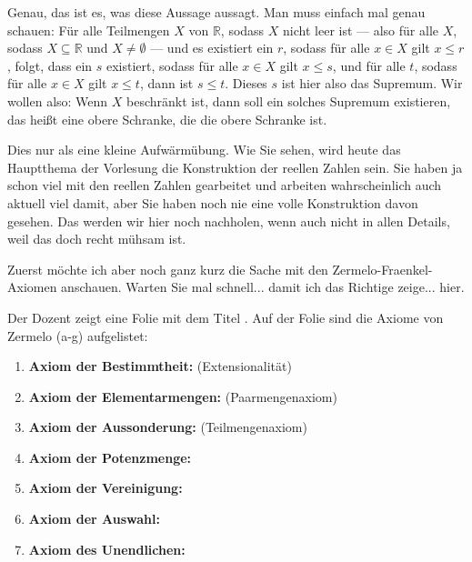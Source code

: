 \begin{spoken-clean}[00:01:45 - 00:03:45]
Genau, das ist es, was diese Aussage aussagt. Man muss einfach mal genau schauen: Für alle Teilmengen $X$ von $\mathbb{R}$, sodass $X$ nicht leer ist --- also für alle $X$, sodass $X \subseteq \mathbb{R}$ und $X \neq \emptyset$ --- und es existiert ein $r$, sodass für alle $x \in X$ gilt $x \le r$, folgt, dass ein $s$ existiert, sodass für alle $x \in X$ gilt $x \le s$, und für alle $t$, sodass für alle $x \in X$ gilt $x \le t$, dann ist $s \le t$. Dieses $s$ ist hier also das Supremum. Wir wollen also: Wenn $X$ beschränkt ist, dann soll ein solches Supremum existieren, das heißt eine obere Schranke, die die  obere Schranke ist.

Dies nur als eine kleine Aufwärmübung. Wie Sie sehen, wird heute das Hauptthema der Vorlesung die Konstruktion der reellen Zahlen sein. Sie haben ja schon viel mit den reellen Zahlen gearbeitet und arbeiten wahrscheinlich auch aktuell viel damit, aber Sie haben noch nie eine volle Konstruktion davon gesehen. Das werden wir hier noch nachholen, wenn auch nicht in allen Details, weil das doch recht mühsam ist.

Zuerst möchte ich aber noch ganz kurz die Sache mit den Zermelo-Fraenkel-Axiomen anschauen. Warten Sie mal schnell... damit ich das Richtige zeige... hier.
\end{spoken-clean}

\begin{meta-note}
Der Dozent zeigt eine Folie mit dem Titel . Auf der Folie sind die Axiome von Zermelo (a-g) aufgelistet:
\begin{enumerate}[label=\textbf{(\alph*)}]
    \item \textbf{Axiom der Bestimmtheit:} (Extensionalität)
    \item \textbf{Axiom der Elementarmengen:} (Paarmengenaxiom)
    \item \textbf{Axiom der Aussonderung:} (Teilmengenaxiom)
    \item \textbf{Axiom der Potenzmenge:}
    \item \textbf{Axiom der Vereinigung:}
    \item \textbf{Axiom der Auswahl:}
    \item \textbf{Axiom des Unendlichen:}
\end{enumerate}
\end{meta-note}

